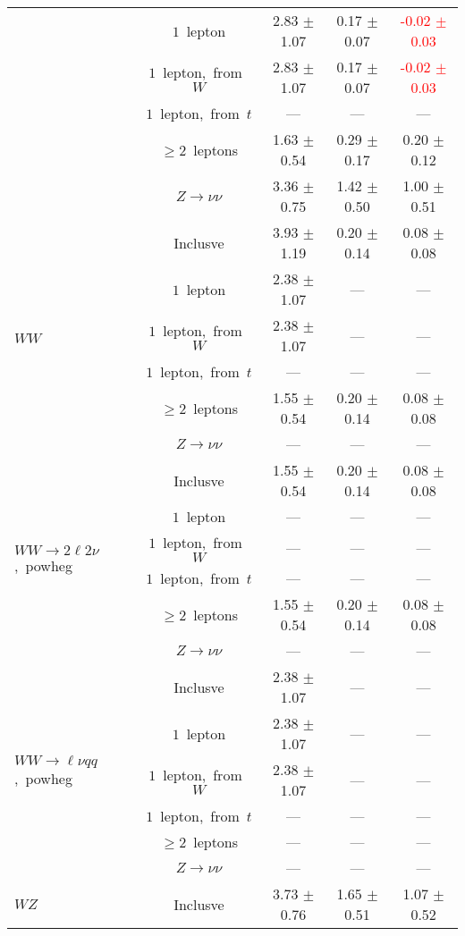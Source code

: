 \documentclass{article}
\begin{document}
\begin{longtable}{|l|c|c|c|c|}
 & $1$~lepton  & 2.83 $\pm$ 1.07  & 0.17 $\pm$ 0.07  & \textcolor{red}{ -0.02 $\pm$ 0.03 } \\* 
 & $1$~lepton,~from~$W$  & 2.83 $\pm$ 1.07  & 0.17 $\pm$ 0.07  & \textcolor{red}{ -0.02 $\pm$ 0.03 } \\* 
 & $1$~lepton,~from~$t$  & ---  & ---  & --- \\* 
 & $\ge2$~leptons  & 1.63 $\pm$ 0.54  & 0.29 $\pm$ 0.17  & 0.20 $\pm$ 0.12 \\* 
 & $Z\rightarrow\nu\nu$  & 3.36 $\pm$ 0.75  & 1.42 $\pm$ 0.50  & 1.00 $\pm$ 0.51 \\* 
\hline 
\multirow{6}{*}{$WW$} & Inclusve  & 3.93 $\pm$ 1.19  & 0.20 $\pm$ 0.14  & 0.08 $\pm$ 0.08 \\* 
 & $1$~lepton  & 2.38 $\pm$ 1.07  & ---  & --- \\* 
 & $1$~lepton,~from~$W$  & 2.38 $\pm$ 1.07  & ---  & --- \\* 
 & $1$~lepton,~from~$t$  & ---  & ---  & --- \\* 
 & $\ge2$~leptons  & 1.55 $\pm$ 0.54  & 0.20 $\pm$ 0.14  & 0.08 $\pm$ 0.08 \\* 
 & $Z\rightarrow\nu\nu$  & ---  & ---  & --- \\* 
\hline 
\multirow{6}{*}{$WW{\rightarrow}2\ell2\nu$,~powheg} & Inclusve  & 1.55 $\pm$ 0.54  & 0.20 $\pm$ 0.14  & 0.08 $\pm$ 0.08 \\* 
 & $1$~lepton  & ---  & ---  & --- \\* 
 & $1$~lepton,~from~$W$  & ---  & ---  & --- \\* 
 & $1$~lepton,~from~$t$  & ---  & ---  & --- \\* 
 & $\ge2$~leptons  & 1.55 $\pm$ 0.54  & 0.20 $\pm$ 0.14  & 0.08 $\pm$ 0.08 \\* 
 & $Z\rightarrow\nu\nu$  & ---  & ---  & --- \\* 
\hline 
\multirow{6}{*}{$WW{\rightarrow}{\ell}{\nu}qq$,~powheg} & Inclusve  & 2.38 $\pm$ 1.07  & ---  & --- \\* 
 & $1$~lepton  & 2.38 $\pm$ 1.07  & ---  & --- \\* 
 & $1$~lepton,~from~$W$  & 2.38 $\pm$ 1.07  & ---  & --- \\* 
 & $1$~lepton,~from~$t$  & ---  & ---  & --- \\* 
 & $\ge2$~leptons  & ---  & ---  & --- \\* 
 & $Z\rightarrow\nu\nu$  & ---  & ---  & --- \\* 
\hline 
\multirow{6}{*}{$WZ$} & Inclusve  & 3.73 $\pm$ 0.76  & 1.65 $\pm$ 0.51  & 1.07 $\pm$ 0.52 \\* 

\end{longtable}
\end{document}
